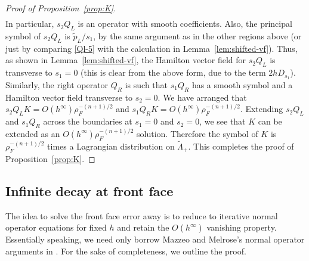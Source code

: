 \documentclass[10pt, a4paper, twoside]{amsart}
\numberwithin{equation}{section}
\theoremstyle{remark}
\begin{document}
\begin{proof}[Proof of Proposition~\ref{prop:K}]
\begin{equation}
\begin{gathered}
\end{gathered}\label{Ql-5}\end{equation}
In particular, $s_2 Q_L$ is an operator with smooth coefficients. Also, the principal symbol of $s_2 Q_L$ is ${\tilde p_L}/s_1$, by the same argument as in the other regions above (or just by comparing \eqref{Ql-5} with the calculation in Lemma~\ref{lem:shifted-vf}). Thus, as shown in Lemma~\ref{lem:shifted-vf}, the Hamilton vector field for $s_2 Q_L$ is transverse to $s_1 = 0$ (this is clear from the above form, due to the term $2 h D_{s_1}$). Similarly, the right operator $Q_R$ is such that $s_1 Q_R$  has a smooth symbol and a Hamilton vector field transverse to $s_2 = 0$. We have arranged that $s_2 Q_L K = O(h^\infty)\rho_F^{-(n+1)/2}$ and $s_1 Q_R K = O(h^\infty)\rho_F^{-(n+1)/2}$. Extending $s_2 Q_L$ and $s_1 Q_R$ across the boundaries at $s_1 = 0$ and $s_2 = 0$, we see that $K$ can be extended as an $O(h^\infty)\rho_F^{-(n+1)/2}$ solution. Therefore the symbol of $K$ is $\rho_F^{-(n+1)/2}$ times a Lagrangian distribution on ${\tilde \Lambda}_+$. This completes the proof of Proposition~\ref{prop:K}. 
\end{proof}

 

 

\subsection{Infinite decay at front face}\label{subsec:ff}

The idea to solve the front face error away is to reduce to iterative normal operator equations for fixed $h$ and retain the $O(h^\infty)$ vanishing property.
Essentially speaking, we need only borrow Mazzeo and Melrose's normal operator arguments in \cite{Mazzeo-Melrose}. For the sake of completeness, we outline the proof.
\end{document}
